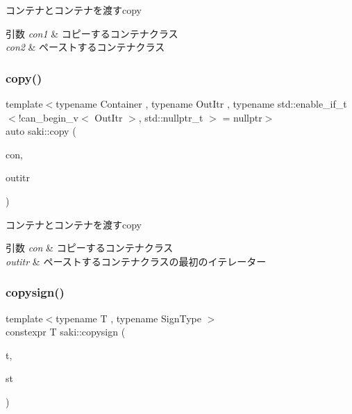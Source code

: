 コンテナとコンテナを渡すcopy 


\begin{DoxyParams}{引数}
{\em con1} & コピーするコンテナクラス \\
\hline
{\em con2} & ペーストするコンテナクラス \\
\hline
\end{DoxyParams}
\mbox{\label{namespacesaki_a810f851279b6d10acc3892433f7036fd}} 
\subsubsection{\texorpdfstring{copy()}{copy()}\hspace{0.1cm}{\footnotesize\ttfamily [2/2]}}
{\footnotesize\ttfamily template$<$typename Container , typename Out\+Itr , typename std\+::enable\+\_\+if\+\_\+t$<$!can\+\_\+begin\+\_\+v$<$ Out\+Itr $>$, std\+::nullptr\+\_\+t $>$  = nullptr$>$ \\
auto saki\+::copy (\begin{DoxyParamCaption}\item[{Container \&\&}]{con,  }\item[{Out\+Itr}]{outitr }\end{DoxyParamCaption})}



コンテナとコンテナを渡すcopy 


\begin{DoxyParams}{引数}
{\em con} & コピーするコンテナクラス \\
\hline
{\em outitr} & ペーストするコンテナクラスの最初のイテレーター \\
\hline
\end{DoxyParams}
\mbox{\label{namespacesaki_a1791113a346dea4c2d7fd8e120016038}} 
\subsubsection{\texorpdfstring{copysign()}{copysign()}}
{\footnotesize\ttfamily template$<$typename T , typename Sign\+Type $>$ \\
constexpr T saki\+::copysign (\begin{DoxyParamCaption}\item[{const T \&}]{t,  }\item[{const Sign\+Type \&}]{st }\end{DoxyParamCaption})}



